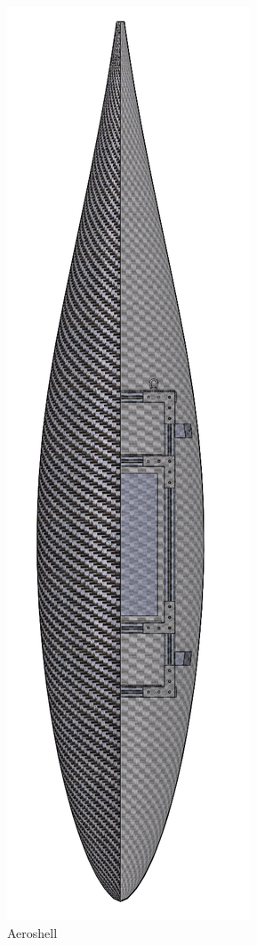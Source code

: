 \begin{figure}[H]
\centering
\begin{subfigure}[b]{.3\textwidth}
  \centering
  \includegraphics[width=0.5\linewidth]{Aeroshell/StructShell.png}
  \caption{\label{fig:structshell} Aeroshell}
\end{subfigure}%
\begin{subfigure}[b]{.3\textwidth}

\end{subfigure}
\end{figure}
